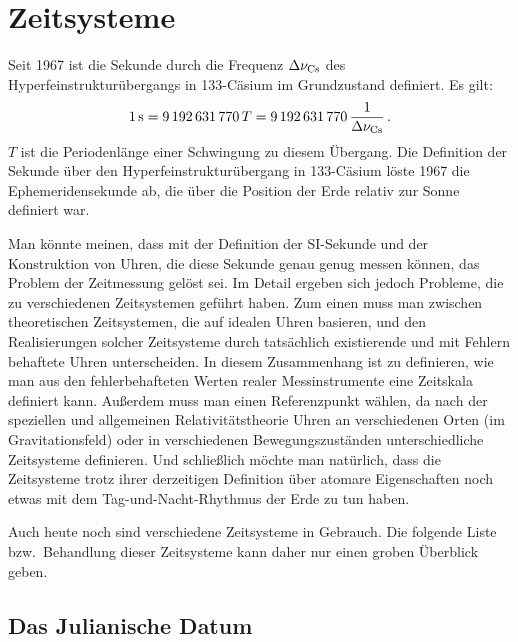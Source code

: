 

\chapter{Zeitsysteme}
\label{chap_Zeitsysteme}

%
Seit 1967 ist die Sekunde 
durch die Frequenz $\Delta \nu_{\rm Cs}$ des Hyperfeinstruktur\"ubergangs
in 133-C\"asium im Grundzustand definiert. Es gilt:
\begin{equation}
               1\,{\rm s}  =  9\,192\,631\,770 \, T = 9\,192\,631\,770 \, \frac{1}{\Delta \nu_{\rm Cs}} \, .
\end{equation}  
$T$ ist die Periodenl\"ange einer Schwingung zu diesem \"Ubergang.
Die Definition der Sekunde \"uber den Hyperfeinstruktur\"ubergang in 133-C\"asium l\"oste 1967 die 
Ephemeridensekunde ab, die \"uber die Position der Erde relativ zur Sonne definiert 
war. 

Man k\"onnte meinen, dass mit der Definition der SI-Sekunde und der Konstruktion von
Uhren, die diese Sekunde genau genug messen k\"onnen, das Problem der Zeitmessung
gel\"ost sei. Im Detail ergeben sich jedoch Probleme, die zu verschiedenen
Zeitsystemen gef\"uhrt haben. Zum einen muss man zwischen theoretischen Zeitsystemen,
die auf idealen Uhren basieren, und den Realisierungen solcher Zeitsysteme durch
tats\"achlich existierende und mit Fehlern behaftete Uhren unterscheiden. In diesem Zusammenhang
ist zu definieren, wie man aus den fehlerbehafteten Werten realer Messinstrumente eine Zeitskala
definiert kann. Au\ss erdem muss
man einen Referenzpunkt w\"ahlen, da nach der speziellen und allgemeinen Relativit\"atstheorie
Uhren an verschiedenen Orten (im Gravitationsfeld) oder in verschiedenen Bewegungszust\"anden
unterschiedliche Zeitsysteme definieren. Und schlie\ss lich m\"ochte man nat\"urlich, dass die
Zeitsysteme trotz ihrer derzeitigen Definition \"uber atomare Eigenschaften noch etwas mit dem 
Tag-und-Nacht-Rhythmus der Erde zu tun haben.

Auch heute noch sind verschiedene Zeitsysteme in Gebrauch. Die folgende Liste bzw.\ Behandlung
dieser Zeitsysteme kann daher nur einen groben \"Uberblick geben. 

\section{Das Julianische Datum}

